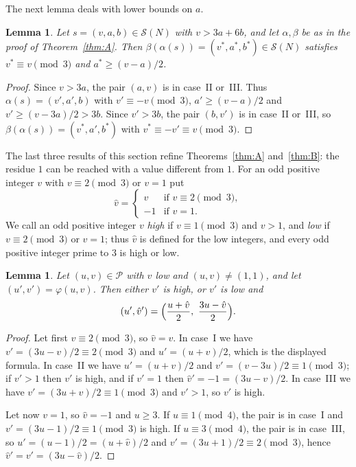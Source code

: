 \documentclass[11pt]{amsart}
\newtheorem{lemma}[theorem]{Lemma}
\theoremstyle{definition}
\theoremstyle{remark}
\newcommand{\cS}{\mathcal{S}}
\newcommand{\cP}{\mathcal{P}}
\begin{document}
The next lemma deals with lower bounds on $a$.

\begin{lemma}\label{lem:large}
Let $s=(v,a,b)\in\cS(N)$ with $v>3a+6b$, and let $\alpha,\beta$ be as in the proof of Theorem~\ref{thm:A}.
Then $\beta(\alpha(s))=(v^*,a^*,b^*)\in\cS(N)$ satisfies $v^*\equiv v\pmod 3$ and $a^*\ge (v-a)/2$.
\end{lemma}

\begin{proof}
Since $v>3a$, the pair $(a,v)$ is in case~II or~III. Thus $\alpha(s)=(v',a',b)$ with $v'\equiv -v\pmod 3$,
$a'\ge (v-a)/2$ and $v'\ge (v-3a)/2>3b$.
Since $v'>3b$, the pair $(b,v')$ is in case~II or~III, so $\beta(\alpha(s))=(v^*,a',b^*)$ with $v^*\equiv -v'\equiv v\pmod 3$.
\end{proof}

The last three results of this section refine Theorems~\ref{thm:A} and~\ref{thm:B}: the residue $1$ can be reached with a value different from $1$.
For an odd positive integer $v$ with $v\equiv 2\pmod 3$ or $v=1$ put
\[
\hat v=\begin{cases} v & \text{if } v\equiv 2\pmod 3,\\ -1 & \text{if } v=1.\end{cases}
\]
We call an odd positive integer $v$ \emph{high} if $v\equiv 1\pmod 3$ and $v>1$, and \emph{low} if $v\equiv 2\pmod 3$ or $v=1$;
thus $\hat v$ is defined for the low integers, and every odd positive integer prime to $3$ is high or low.

\begin{lemma}\label{lem:hat}
Let $(u,v)\in\cP$ with $v$ low and $(u,v)\ne(1,1)$, and let $(u',v')=\varphi(u,v)$. Then either $v'$ is high, or $v'$ is low and
\[
(u',\hat v')=\Bigl(\frac{u+\hat v}{2},\ \frac{3u-\hat v}{2}\Bigr).
\]
\end{lemma}

\begin{proof}
Let first $v\equiv 2\pmod 3$, so $\hat v=v$. In case~I we have $v'=(3u-v)/2\equiv 2\pmod 3$ and $u'=(u+v)/2$, which is the displayed formula.
In case~II we have $u'=(u+v)/2$ and $v'=(v-3u)/2\equiv 1\pmod 3$; if $v'>1$ then $v'$ is high, and if $v'=1$ then $\hat v'=-1=(3u-v)/2$.
In case~III we have $v'=(3u+v)/2\equiv 1\pmod 3$ and $v'>1$, so $v'$ is high.

Let now $v=1$, so $\hat v=-1$ and $u\ge 3$. If $u\equiv 1\pmod 4$, the pair is in case~I and $v'=(3u-1)/2\equiv 1\pmod 3$ is high.
If $u\equiv 3\pmod 4$, the pair is in case~III, so $u'=(u-1)/2=(u+\hat v)/2$ and $v'=(3u+1)/2\equiv 2\pmod 3$, hence $\hat v'=v'=(3u-\hat v)/2$.
\end{proof}
\end{document}
